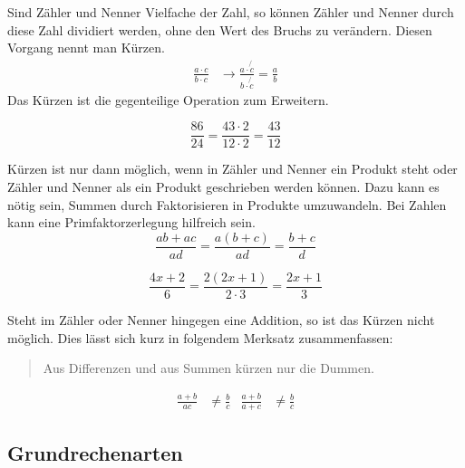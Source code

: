 \begin{regel}[Kürzen]
 Sind Zähler und Nenner Vielfache der Zahl, so können Zähler und Nenner durch diese Zahl dividiert werden, ohne den Wert des Bruchs zu verändern. Diesen Vorgang nennt man Kürzen.
 \begin{align*}
 \frac{a\cdot c}{b\cdot c} &\rightarrow \frac{a\cdot \not{c}}{b\cdot \not{c}}=\frac{a}{b}
 \end{align*}
 Das Kürzen ist die gegenteilige Operation zum Erweitern.
\end{regel}
 
\begin{bsp}
 \begin{equation*}
  \frac{86}{24} = \frac{43\cdot 2}{12 \cdot 2} =
  \frac{43}{12}
 \end{equation*}
\end{bsp}

\begin{beme}
 Kürzen ist nur dann möglich, wenn in Zähler und Nenner ein Produkt steht oder Zähler und Nenner als ein Produkt geschrieben werden können. Dazu kann es nötig sein, Summen durch Faktorisieren in Produkte umzuwandeln. Bei Zahlen kann eine Primfaktorzerlegung hilfreich sein.
 \begin{equation*}
  \frac{ab+ac}{ad} = \frac{a(b+c)}{ad} = \frac{b+c}{d}
 \end{equation*}
\end{beme}

\begin{bsp}
 \begin{equation*}
  \frac{4x+2}{6} = \frac{2(2x+1)}{2\cdot 3} = \frac{2x+1}{3}
 \end{equation*}
\end{bsp}


\begin{beme}
Steht im Zähler oder Nenner hingegen eine Addition, so ist das Kürzen nicht möglich. Dies lässt sich kurz in folgendem Merksatz zusammenfassen:
 \begin{quotation}
  Aus Differenzen und aus Summen kürzen nur die Dummen.
 \end{quotation}
 \begin{align*}
  \frac{a+b}{ac} &\ne \frac{b}{c} & \frac{a+b}{a+c} &\ne\frac{b}{c}
 \end{align*}
\end{beme}


\subsection{Grundrechenarten}

